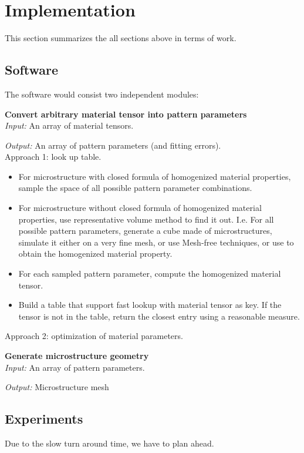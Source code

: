 \section{Implementation}
This section summarizes the all sections above in terms of work.

\subsection{Software}
The software would consist two independent modules:
\begin{description}
\item{\bf Convert arbitrary material tensor into pattern parameters}\\
{\it Input:} An array of material tensors.

{\it Output:} An array of pattern parameters (and fitting errors).\\

Approach 1: look up table.
\begin{itemize}
\item For microstructure with closed formula of homogenized material properties,
sample the space of all possible pattern parameter combinations.
\item For microstructure without closed formula of homogenized material
properties, use representative volume method to find it out.  I.e. For all
possible pattern parameters, generate a
cube made of microstructures, simulate it either on a very fine mesh, or use
Mesh-free techniques, or use \cite{Kharevych2009} to obtain the homogenized
material property.
\item For each sampled pattern parameter, compute the homogenized material
tensor.
\item Build a table that support fast lookup with material tensor as key.  If
the tensor is not in the table, return the closest entry using a reasonable
measure.
\end{itemize}

Approach 2: optimization of material parameters.



\item{\bf Generate microstructure geometry}\\
{\it Input:} An array of pattern parameters.

{\it Output:} Microstructure mesh


\end{description}

\subsection{Experiments}
Due to the slow turn around time, we have to plan ahead.
